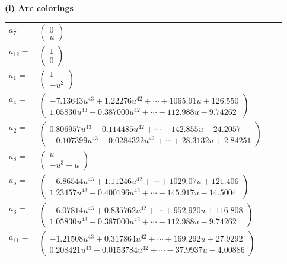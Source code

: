 \documentclass[1p]{elsarticle_modified}
\theoremstyle{definition}
\begin{document}
\flushleft \textbf{(i) Arc colorings}\\
\begin{tabular}{m{7pt} m{180pt} m{7pt} m{180pt} }
\flushright $a_{7}=$&$\begin{pmatrix}0\\u\end{pmatrix}$ \\
\flushright $a_{12}=$&$\begin{pmatrix}1\\0\end{pmatrix}$ \\
\flushright $a_{1}=$&$\begin{pmatrix}1\\- u^2\end{pmatrix}$ \\
\flushright $a_{4}=$&$\begin{pmatrix}-7.13643 u^{43}+1.22276 u^{42}+\cdots+1065.91 u+126.550\\1.05830 u^{43}-0.387000 u^{42}+\cdots-112.988 u-9.74262\end{pmatrix}$ \\
\flushright $a_{2}=$&$\begin{pmatrix}0.806957 u^{43}-0.114485 u^{42}+\cdots-142.855 u-24.2057\\-0.107399 u^{43}-0.0284322 u^{42}+\cdots+28.3132 u+2.84251\end{pmatrix}$ \\
\flushright $a_{8}=$&$\begin{pmatrix}u\\- u^3+u\end{pmatrix}$ \\
\flushright $a_{5}=$&$\begin{pmatrix}-6.86544 u^{43}+1.11246 u^{42}+\cdots+1029.07 u+121.406\\1.23457 u^{43}-0.400196 u^{42}+\cdots-145.917 u-14.5004\end{pmatrix}$ \\
\flushright $a_{3}=$&$\begin{pmatrix}-6.07814 u^{43}+0.835762 u^{42}+\cdots+952.920 u+116.808\\1.05830 u^{43}-0.387000 u^{42}+\cdots-112.988 u-9.74262\end{pmatrix}$ \\
\flushright $a_{11}=$&$\begin{pmatrix}-1.21508 u^{43}+0.317864 u^{42}+\cdots+169.292 u+27.9292\\0.208421 u^{43}-0.0153784 u^{42}+\cdots-37.9937 u-4.00886\end{pmatrix}$ \\

\end{tabular}
\end{document}
